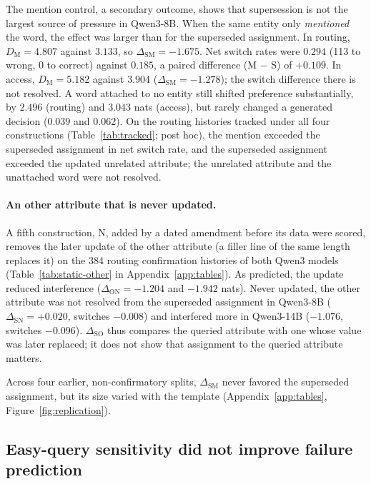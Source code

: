 The mention control, a secondary outcome, shows that supersession is not the largest source of pressure
in Qwen3-8B.
When the same entity only \emph{mentioned} the word, the effect was larger than for the superseded
assignment. In routing, $D_{\mathrm{M}} = 4.807$ against $3.133$, so
$\Delta_{\mathrm{SM}} = -1.675$. Net switch rates were $0.294$ (113 to wrong, 0 to
correct) against $0.185$, a paired difference (M $-$ S) of $+0.109$. In access, $D_{\mathrm{M}} = 5.182$ against
$3.904$ ($\Delta_{\mathrm{SM}} = -1.278$); the switch difference there is not resolved. A word attached to no entity still shifted preference
substantially, by $2.496$ (routing) and $3.043$ nats (access), but rarely changed a generated decision
($0.039$ and $0.062$). On the routing histories tracked under all four constructions (Table~\ref{tab:tracked}; post hoc), the mention
exceeded the superseded assignment in net switch rate, and the superseded assignment exceeded the updated unrelated
attribute; the unrelated attribute and the unattached word were not resolved.

\paragraph{An other attribute that is never updated.} A fifth construction, N, added by a dated amendment before
its data were scored, removes the later update of the other attribute (a filler line of the same length
replaces it) on the 384 routing confirmation histories of both Qwen3 models (Table~\ref{tab:static-other} in
Appendix~\ref{app:tables}). As predicted, the update reduced interference ($\Delta_{\mathrm{ON}} =
-1.204$ and $-1.942$ nats). Never updated, the other attribute was not resolved from the superseded
assignment in Qwen3-8B ($\Delta_{\mathrm{SN}} = +0.020$, switches $-0.008$) and interfered more in Qwen3-14B
($-1.076$, switches $-0.096$). $\Delta_{\mathrm{SO}}$ thus compares the queried attribute with one whose value
was later replaced; it does not show that assignment to the queried attribute matters.

Across four earlier, non-confirmatory splits, $\Delta_{\mathrm{SM}}$ never favored the superseded
assignment, but its size varied with the template (Appendix~\ref{app:tables}, Figure~\ref{fig:replication}).

\subsection{Easy-query sensitivity did not improve failure prediction}
\label{sec:results-h3}

